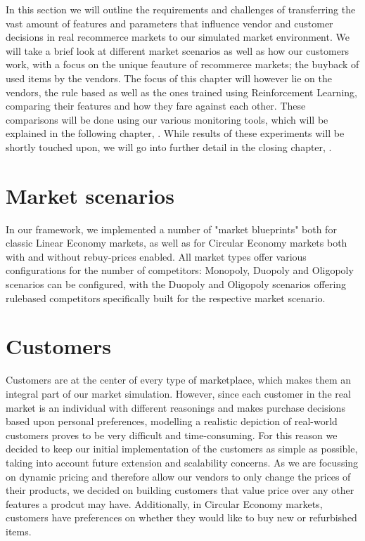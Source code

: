 \begin{jointwork}
	In this section we will outline the requirements and challenges of transferring the vast amount of features and parameters that influence vendor and customer decisions in real recommerce markets to our simulated market environment. We will take a brief look at different market scenarios  as well as how our customers work, with a focus on the unique feauture of recommerce markets; the buyback of used items by the vendors. The focus of this chapter will however lie on the vendors, the rule based as well as the ones trained using Reinforcement Learning, comparing their features and how they fare against each other. These comparisons will be done using our various monitoring tools, which will be explained in the following chapter, . While results of these experiments will be shortly touched upon, we will go into further detail in the closing chapter, .
\end{jointwork}

\section{Market scenarios} \label{section:MarketScenarios}

In our framework, we implemented a number of "market blueprints" both for classic Linear Economy markets, as well as for Circular Economy markets both with and without rebuy-prices enabled. All market types offer various configurations for the number of competitors: Monopoly, Duopoly and Oligopoly scenarios can be configured, with the Duopoly and Oligopoly scenarios offering rulebased competitors specifically built for the respective market scenario.

\section{Customers}

Customers are at the center of every type of marketplace, which makes them an integral part of our market simulation. However, since each customer in the real market is an individual with different reasonings and makes purchase decisions based upon personal preferences, modelling a realistic depiction of real-world customers proves to be very difficult and time-consuming. For this reason we decided to keep our initial implementation of the customers as simple as possible, taking into account future extension and scalability concerns. As we are focussing on dynamic pricing and therefore allow our vendors to only change the prices of their products, we decided on building customers that value price over any other features a prodcut may have. Additionally, in Circular Economy markets, customers have preferences on whether they would like to buy new or refurbished items.

